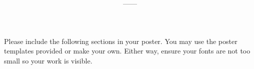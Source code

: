 \documentclass[11pt,onecolumn]{article}
\title{\textbf{\coursename}}
\author{{\semester}---{\roomnumb}---{\classtimes}}
\date{}
\makeatletter
\newcommand{\myname}{A.~Grant Schissler}
\newcommand{\myemail}{aschissler@unr.edu}
\newcommand{\office}{DMSC 224}
\newcommand{\officehours}{Tue 2:30pm-3:30pm, Wed 1:30pm-2:30pm, or by appointment}
\makeatother
\begin{document}
\maketitle

\vspace{-0.25in}
\noindent\makebox[\linewidth]{\rule{\textwidth}{1pt}}


Please include the following sections in your poster. You may use the poster templates provided or make your own. Either way, ensure your fonts are not too small so your work is visible.
\end{document}
